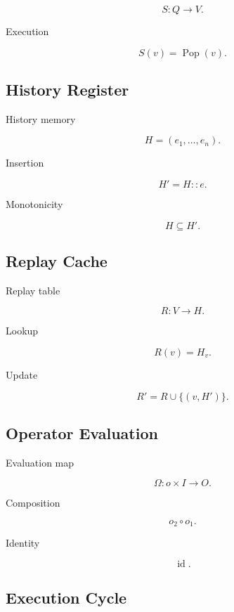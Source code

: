 \documentclass[12pt,oneside]{article}
\theoremstyle{definition}
\theoremstyle{remark}
\begin{document}
\[
S
:
Q
\rightarrow
V.
\]

Execution

\[
S(v)
=
\operatorname{Pop}(v).
\]

\subsection*{History Register}

History memory

\[
H
=
(e_1,\ldots,e_n).
\]

Insertion

\[
H'
=
H::e.
\]

Monotonicity

\[
H
\subseteq
H'.
\]

\subsection*{Replay Cache}

Replay table

\[
R
:
V
\rightarrow
H.
\]

Lookup

\[
R(v)
=
H_v.
\]

Update

\[
R'
=
R
\cup
\{
(v,H')
\}.
\]

\subsection*{Operator Evaluation}

Evaluation map

\[
\Omega
:
o
\times
I
\rightarrow
O.
\]

Composition

\[
o_2
\circ
o_1.
\]

Identity

\[
\operatorname{id}.
\]

\subsection*{Execution Cycle}
\end{document}
